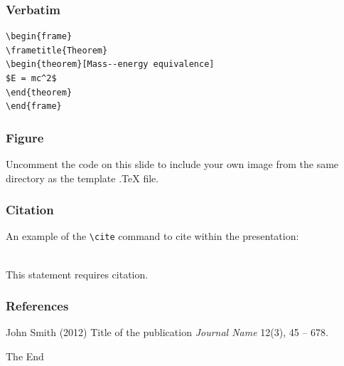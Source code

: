 \documentclass{beamer}
\begin{document}

\begin{frame}[fragile] %
\frametitle{Verbatim}
\begin{example}
\begin{verbatim}
\begin{frame}
\frametitle{Theorem}
\begin{theorem}[Mass--energy equivalence]
$E = mc^2$
\end{theorem}
\end{frame}\end{verbatim}
\end{example}
\end{frame}


\begin{frame}
\frametitle{Figure}
Uncomment the code on this slide to include your own image from the same directory as the template .TeX file.
\end{frame}


\begin{frame}[fragile] %
\frametitle{Citation}
An example of the \verb|\cite| command to cite within the presentation:\\~

This statement requires citation.
\end{frame}


\begin{frame}
\frametitle{References}
\footnotesize{
\begin{thebibliography}{99} %
 John Smith (2012)
\newblock Title of the publication
\newblock \emph{Journal Name} 12(3), 45 -- 678.
\end{thebibliography}
}
\end{frame}


\begin{frame}
\Huge{\centerline{The End}}
\end{frame}

\end{document}
